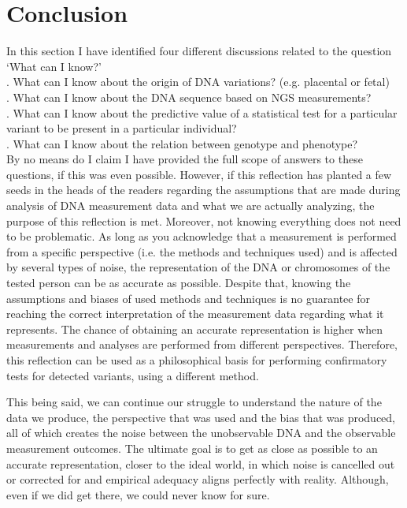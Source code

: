\section{Conclusion} \label{Conclusion}
In this section I have identified four different discussions related to the question ‘What can I know?’ \\

.	What can I know about the origin of DNA variations? (e.g. placental or fetal) \\

.	What can I know about the DNA sequence based on NGS measurements? \\

.	What can I know about the predictive value of a statistical test for a particular variant to be present in a particular individual? \\

.	What can I know about the relation between genotype and phenotype? \\

\noindent By no means do I claim I have provided the full scope of answers to these questions, if this was even possible. 
However, if this reflection has planted a few seeds in the heads of the readers regarding the assumptions that are made during analysis of DNA measurement data and what we are actually analyzing, the purpose of this reflection is met. 
Moreover, not knowing everything does not need to be problematic. 
As long as you acknowledge that a measurement is performed from a specific perspective (i.e. the methods and techniques used) and is affected by several types of noise, the representation of the DNA or chromosomes of the tested person can be as accurate as possible. 
Despite that, knowing the assumptions and biases of used methods and techniques is no guarantee for reaching the correct interpretation of the measurement data regarding what it represents. 
The chance of obtaining an accurate representation is higher when measurements and analyses are performed from different perspectives. 
Therefore, this reflection can be used as a philosophical basis for performing confirmatory tests for detected variants, using a different method. 

This being said, we can continue our struggle to understand the nature of the data we produce, the perspective that was used and the bias that was produced, all of which creates the noise between the unobservable DNA and the observable measurement outcomes. 
The ultimate goal is to get as close as possible to an accurate representation, closer to the ideal world, in which noise is cancelled out or corrected for and empirical adequacy aligns perfectly with reality. 
Although, even if we did get there, we could never know for sure. 


